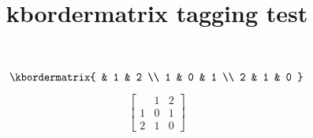 \documentclass{article}
\title{kbordermatrix tagging test}
\begin{document}
\[
\kbordermatrix{
      & 1 & 2 \\
    1 & 0 & 1 \\
    2 & 1 & 0
  }
\]

\[
\begin{bmatrix}
      & 1 & 2 \\
    1 & 0 & 1 \\
    2 & 1 & 0
\end{bmatrix}
\]
\end{document}
